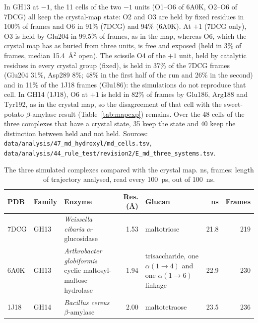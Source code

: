 \documentclass[preprint,12pt]{elsarticle}
\begin{document}
In GH13 at $-1$, the 11 cells of the two $-1$ units (O1--O6 of 6A0K, O2--O6 of 7DCG) all keep the crystal-map
state: O2 and O3 are held by fixed residues in 100\% of frames and O6 in 91\% (7DCG) and 94\% (6A0K). At $+1$
(7DCG only), O3 is held by Glu204 in 99.5\% of frames, as in the map, whereas O6, which the crystal map has as buried
from three units, is free and exposed (held in 3\% of frames, median 15.4~\AA$^2$ open). The scissile O4 of the $+1$
unit, held by catalytic residues in every crystal group (fixed), is held in 37\% of the 7DCG frames (Glu204 31\%, Asp289
8\%; 48\% in the first half of the run and 26\% in the second) and in 11\% of the 1J18 frames (Glu186): the
simulations do not reproduce that cell. In GH14 (1J18), O6 at $+1$ is held in 82\% of frames by Glu186, Arg188 and
Tyr192, as in the crystal map, so the disagreement of that cell with the sweet-potato $\beta$-amylase result
(Table~\ref{tab:mapexp}) remains. Over the 48 cells of the three complexes that have a crystal state, 35 keep the
state and 40 keep the distinction between held and not held. Sources:
\texttt{data/analysis/47\_md\_hydroxyl/md\_cells.tsv},
\texttt{data/analysis/44\_rule\_test/revision2/E\_md\_three\_systems.tsv}.

\begin{table}[h]
\centering\scriptsize\setlength{\tabcolsep}{3pt}
\caption{The three simulated complexes compared with the crystal map. ns, frames: length of trajectory analysed, read
every 100~ps, out of 100~ns.}
\label{tab:mdsys}
\begin{tabular}{llp{4.2cm}rp{3.4cm}rr}
\toprule
PDB & Family & Enzyme & Res. (\AA) & Glucan & ns & Frames\\
\midrule
7DCG & GH13 & \emph{Weissella cibaria} $\alpha$-glucosidase & 1.53 & maltotriose & 21.8 & 219\\
6A0K & GH13 & \emph{Arthrobacter globiformis} cyclic maltosyl-maltose hydrolase & 1.94 & trisaccharide, one $\alpha(1\!\to\!4)$ and one $\alpha(1\!\to\!6)$ linkage & 22.9 & 230\\
1J18 & GH14 & \emph{Bacillus cereus} $\beta$-amylase & 2.00 & maltotetraose & 23.5 & 236\\
\bottomrule
\end{tabular}
\end{table}
\end{document}
